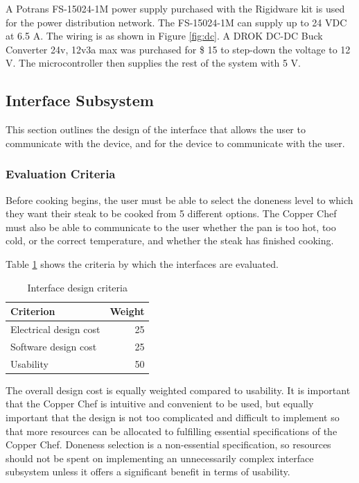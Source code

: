 \documentclass[11pt]{article}
\begin{document}
\noindent
A Potrans FS-15024-1M \cite{se14} power supply purchased with the Rigidware kit is used for the power distribution network.
The FS-15024-1M can supply up to 24 VDC at 6.5 A.
The wiring is as shown in Figure \ref{fig:dc}.
A DROK DC-DC Buck Converter 24v, 12v3a max \cite{se15} was purchased for \$ 15 to step-down the voltage to 12 V.
The microcontroller then supplies the rest of the system with 5 V.

\subsection{Interface Subsystem}

This section outlines the design of the interface that allows the user to communicate with the device, and for the device to communicate with the user.

\subsubsection{Evaluation Criteria}

Before cooking begins, the user must be able to select the doneness level to which they want their steak to be cooked from 5 different options.
The Copper Chef must also be able to communicate to the user whether the pan is too hot, too cold, or the correct temperature, and whether the steak has finished cooking.

Table \ref{table:interface criteria} shows the criteria by which the interfaces are evaluated.

\begin{table}[H]
\begin{tabularx}{\textwidth}{X  r}

\hline

Criterion & Weight \\

\hline

Electrical design cost & 25 \\
Software design cost & 25 \\
Usability & 50 \\

\hline

\end{tabularx}
\caption{Interface design criteria}
\label{table:interface criteria}
\end{table}

The overall design cost is equally weighted compared to usability.
It is important that the Copper Chef is intuitive and convenient to be used, but equally important that the design is not too complicated and difficult to implement so that more resources can be allocated to fulfilling essential specifications of the Copper Chef.
Doneness selection is a non-essential specification, so resources should not be spent on implementing an unnecessarily complex interface subsystem unless it offers a significant benefit in terms of usability.
\end{document}
